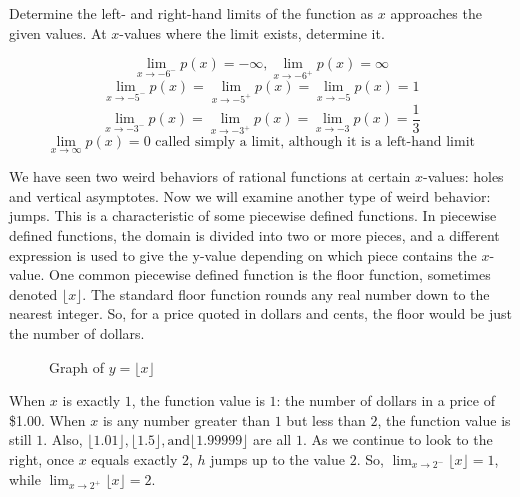 \begin{Exercise}[title=Limits Practice 1, label=limits1]
  Determine the left- and right-hand limits of the function as $x$ approaches the given values. At $x$-values where the limit exists, determine it.
  \vspace{40mm}
\end{Exercise}
\begin{Answer}[ref=limits1] 
	$$ \lim_{x \rightarrow -6^-} p(x) = -\infty, \lim_{x \rightarrow -6^+} p(x) = \infty $$
	$$ \lim_{x \rightarrow -5^-} p(x) = \lim_{x \rightarrow -5^+} p(x) = \lim_{x \rightarrow -5} p(x) = 1 $$
	$$ \lim_{x \rightarrow -3^-} p(x) = \lim_{x \rightarrow -3^+} p(x) = \lim_{x \rightarrow -3} p(x) = \frac{1}{3} $$
	$$ \lim_{x \rightarrow \infty} p(x) = 0 \text{ called simply a limit, although it is a left-hand limit} $$
\end{Answer}

We have seen two weird behaviors of rational functions at certain $x$-values: holes and vertical asymptotes. Now we will examine another type of weird behavior: jumps. This is a characteristic of some piecewise defined functions. In piecewise defined functions, the domain is divided into two or more pieces, and a different expression is used to give the y-value depending on which piece contains the $x$-value. One common piecewise defined function is the floor function, sometimes denoted $\lfloor x \rfloor$. The standard floor function rounds any real number down to the nearest integer. So, for a price quoted in dollars and cents, the floor would be just the number of dollars.

\begin{figure}[htbp]
  \centering
  \caption{Graph of \( y = \lfloor x \rfloor \)}
\end{figure}	

When $x$ is exactly $1$, the function value is $1$: the number of dollars in a price of \$1.00. When $x$ is any number greater than $1$ but less than $2$, the function value is still $1$. Also, $ \lfloor 1.01 \rfloor, \lfloor 1.5 \rfloor, \text{and} \lfloor 1.99999 \rfloor$ are all $1$. As we continue to look to the right, once $x$ equals exactly $2$, $h$ jumps up to the value $2$. So, $ \lim_{x \rightarrow 2^-} \lfloor x \rfloor = 1 $, while $ \lim_{x \rightarrow 2^+} \lfloor x \rfloor = 2 $.

